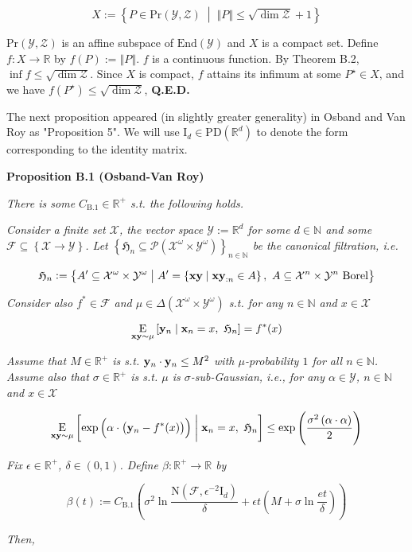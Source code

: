 \documentclass[a4paper]{article}
\newcommand{\Co}[1]{}
\newcommand{\AP}[1]{\left(#1\right)}
\newcommand{\AC}[1]{\left\{#1\right\}}
\newcommand{\ABM}[2]{\left[#1\;\middle\vert\;#2\right]}
\newcommand{\ACM}[2]{\left\{#1\;\middle\vert\;#2\right\}}
\newcommand{\CE}[3]{\underset{#1}{\operatorname{E}}\ABM{#2}{#3}}
\newcommand{\PS}[1]{\mathcal{P}\AP{#1}}
\newcommand{\Nats}{\mathbb{N}}
\newcommand{\Reals}{\mathbb{R}}
\newcommand{\Id}{\mathrm{I}}
\newcommand{\PD}{\mathrm{PD}}
\newcommand{\End}{\mathrm{End}}
\newcommand{\Norm}[1]{\left\Vert #1 \right\Vert}
\newcommand{\X}{\mathcal{X}}
\newcommand{\Y}{\mathcal{Y}}
\newcommand{\Z}{\mathcal{Z}}
\newcommand{\F}{\mathcal{F}}
\newcommand{\N}{\mathrm{N}}
\begin{document}
$$X:=\ACM{P\in\mathrm{Pr}(\Y,\Z)}{\Norm{P}\leq\sqrt{\dim{\Z}}+1}$$

$\mathrm{Pr}(\Y,\Z)$ is an affine subspace of $\End(\Y)$ and $X$ is a compact set. Define $f:X\rightarrow\Reals$ by $f(P):=\Norm{P}$. $f$ is a continuous function. By Theorem B.2, $\inf f \leq \sqrt{\dim\Z}$. Since $X$ is compact, $f$ attains its infimum at some $P^\star\in X$, and we have $f\AP{P^\star} \leq \sqrt{\dim\Z}$, \textbf{Q.E.D.}\Co{b}

The next proposition appeared (in slightly greater generality) in Osband and Van Roy as "Proposition 5". We will use $\Id_d\in\PD\AP{\Reals^d}$ to denote the form corresponding to the identity matrix.

\textbf{Proposition B.1 (Osband-Van Roy)}\Co{b}

\textit{There is some $C_{\mathrm{B.1}}\in\Reals^+$ s.t. the following holds.}\Co{i}

\textit{Consider a finite set $\X$, the vector space $\Y:=\Reals^d$ for some $d\in\Nats$ and some $\F\subseteq\AC{\X\rightarrow\Y}$. Let $\AC{\mathfrak{H}_n\subseteq\PS{\X^\omega\times\Y^\omega}}_{n\in\Nats}$ be the canonical filtration, i.e.}\Co{i}

$$\mathfrak{H}_n:=\ACM{A'\subseteq\X^\omega\times\Y^\omega}{A'=\ACM{\bold{xy}}{\bold{xy}_{:n}\in A},\ A\subseteq\X^n\times\Y^n\text{ Borel}}$$

\textit{Consider also $f^*\in\F$ and $\mu\in\Delta\AP{\X^\omega\times\Y^\omega}$ s.t. for any $n\in\Nats$ and $x\in\X$}\Co{i}

$$\CE{\bold{xy}\sim\mu}{\bold{y}_n}{\bold{x}_n=x,\ \mathfrak{H}_n} = f^*(x)$$

\textit{Assume that $M\in\Reals^+$ is s.t. $\bold{y}_n\cdot\bold{y}_n\leq M^2$ with $\mu$-probability $1$ for all $n\in\Nats$. Assume also that $\sigma\in\Reals^+$ is s.t. $\mu$ is $\sigma$-sub-Gaussian, i.e., for any $\alpha\in\Y$, $n\in\Nats$ and $x\in\X$}\Co{i}

$$\CE{\bold{xy}\sim\mu}{\exp\AP{\alpha\cdot\AP{\bold{y}_n-f^*(x)}}}{\bold{x}_n=x,\ \mathfrak{H}_n} \leq \exp\AP{\frac{\sigma^2\AP{\alpha\cdot\alpha}}{2}}$$

\textit{Fix $\epsilon\in\Reals^+$, $\delta\in(0,1)$. Define $\beta:\Reals^+\rightarrow\Reals$ by}\Co{i}

$$\beta(t):=C_{\mathrm{B.1}}\AP{\sigma^2 \ln{\frac{\N\AP{\F,\epsilon^{-2}\Id_d}}{\delta}}+\epsilon t\AP{M+\sigma\ln{\frac{et}{\delta}}}}$$

\textit{Then,}\Co{i}
\end{document}
